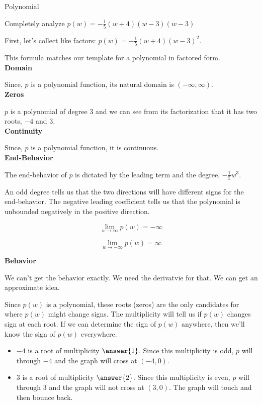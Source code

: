 \documentclass{ximera}
\begin{document}
\begin{example} Polynomial


Completely analyze $p(w) = -\frac{1}{5}(w+4)(w-3)(w-3)$


First, let's collect like factors: $p(w) = -\frac{1}{5}(w+4)(w-3)^2$.


This formula matches our template for a polynomial in factored form. \\

\textbf{Domain}

Since, $p$ is a polynomial function, its natural domain is $(-\infty, \infty)$. \\



\textbf{Zeros}



$p$ is a polynomial of degree $3$ and we can see from its factorization that it has two roots, $-4$ and $3$. \\  




\textbf{Continuity}

Since, $p$ is a polynomial function, it is continuous. \\



\textbf{End-Behavior}


The end-behavior of $p$ is dictated by the leading term and the degree, $-\frac{1}{5} w^3$.  

An odd degree tells us that the two directions will have different signs for the end-behavior.  The negative leading coefficient tells us that the polynomial is unbounded negatively in the positive direction.


\[
\lim\limits_{w \to \infty}p(w) = -\infty
\]


\[
\lim\limits_{w \to -\infty}p(w) = \infty
\] 






\textbf{Behavior}

We can't get the behavior exactly.  We need the derivatvie for that. We can get an approximate idea.

Since $p(w)$ is a polynomial, these roots (zeros) are the only candidates for where $p(w)$ might change signs.  The multiplicity will tell us if $p(w)$ changes sign at each root. If we can determine the sign of $p(w)$ anywhere, then we'll know the sign of $p(w)$ everywhere.\\

\begin{itemize}
\item $-4$ is a root of multiplicity $\answer{1}$.  Since this multiplicity is odd, $p$ will  through $-4$ and the graph will cross at $(-4,0)$.
\item $3$ is a root of multiplicity $\answer{2}$.  Since this multiplicity is even, $p$ will  through $3$ and the graph will not cross at $(3,0)$.  The graph will touch and then bounce back.
\end{itemize}






\end{example}
\end{document}
